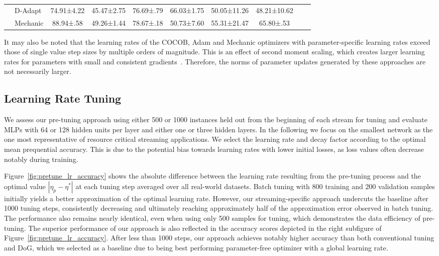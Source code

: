 \documentclass[runningheads]{llncs}
\begin{document}
\begin{table}[ht]
\begin{tabular}{llcccccccc}
		                                                   & D-Adapt                    \cite{defazioLearningRateFreeLearningDAdaptation2023a} & 74.91±4.22          & 45.47±2.75           & 76.69±.79             & 66.03±1.75           & 50.05±11.26         & 48.21±10.62         \\
		                                                   & Mechanic \cite{cutkoskyMechanicLearningRate2023}                                  & 88.94±.58           & 49.26±1.44           & 78.67±.18             & 50.73±7.60           & 55.31±21.47         & 65.80±.53           \\
		\bottomrule
	\end{tabular}
	\label{tab:results_adaptive_optims}
\end{table}

It may also be noted that the learning rates of the COCOB, Adam and Mechanic optimizers with parameter-specific learning rates exceed those of single value step sizes by multiple orders of magnitude.
This is an effect of second moment scaling, which creates larger learning rates for parameters with small and consistent gradients~\cite{cutkoskyMechanicLearningRate2023}.
Therefore, the norms of parameter updates generated by these approaches are not necessarily larger.


\subsection{Learning Rate Tuning}

We assess our pre-tuning approach using either 500 or 1000 instances held out from the beginning of each stream for tuning and evaluate MLPs with 64 or 128 hidden units per layer and either one or three hidden layers.
In the following we focus on the smallest network as the one most representative of resource critical streaming applications.
We select the learning rate and decay factor according to the optimal mean prequential accuracy. This is due to the potential bias towards learning rates with lower initial losses, as loss values often decrease notably during training.

Figure~\ref{fig:pretune_lr_accuracy} shows the absolute difference between the learning rate resulting from the pre-tuning process and the optimal value $|\eta_p - \eta^*|$ at each tuning step averaged over all real-world datasets.
Batch tuning with 800 training and 200 validation samples initially yields a better approximation of the optimal learning rate. However, our streaming-specific approach undercuts the baseline after 1000 tuning steps, consistently decreasing and ultimately reaching approximately half of the approximation error observed in batch tuning.
The performance also remains nearly identical, even when using only 500 samples for tuning, which demonstrates the data efficiency of pre-tuning.
The superior performance of our approach is also reflected in the accuracy scores depicted in the right subfigure of Figure~\ref{fig:pretune_lr_accuracy}.
After less than 1000 steps, our approach achieves notably higher accuracy than both conventional tuning and DoG, which we selected as a baseline due to being best performing parameter-free optimizer with a global learning rate.
\end{document}
